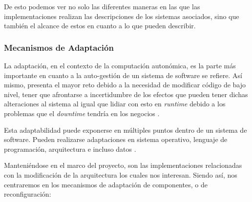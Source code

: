 \documentclass[12pt]{article}
\begin{document}
    De esto podemos ver no solo las diferentes maneras en las que las implementaciones realizan las descripciones de los sistemas asociados, sino que también el alcance de estos en cuanto a lo que pueden describir.
    
    \subsubsection*{Mecanismos de Adaptación}
    

    La adaptación, en el contexto de la computación autonómica, es la parte más importante en cuanto a la auto-gestión de un sistema de software se refiere. Así mismo, presenta el mayor reto debido a la necesidad de modificar código de bajo nivel, tener que afrontarse a incertidumbre de los efectos que pueden tener dichas alteraciones al sistema al igual que lidiar con esto en \textit{runtime} debido a los problemas que el \textit{downtime} tendría en los negocios \cite{lalanda_diaconescu_mccann_2014}. 
    
    Esta adaptabilidad puede exponerse en múltiples puntos dentro de un sistema de software. Pueden realizarse adaptaciones en sistema operativo, lenguaje de programación, arquitectura e incluso datos \cite{lalanda_diaconescu_mccann_2014}. 

    Manteniéndose en el marco del proyecto, son las implementaciones relacionadas con la modificación de la arquitectura los cuales nos interesan. Siendo así, nos centraremos en los mecanismos de adaptación de componentes, o de reconfiguración:
\end{document}
